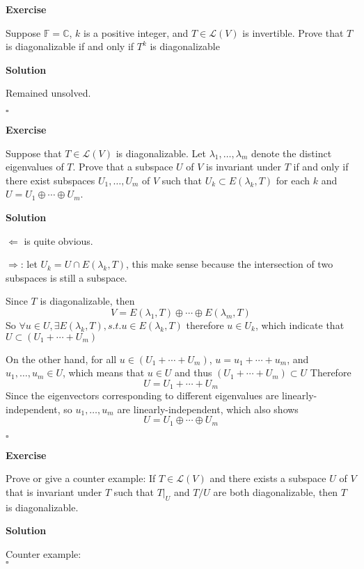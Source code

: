 \documentclass{article}
\newenvironment{exercise}{%
{\textbf{Exercise\\}
    }
}{
}
\newenvironment{solution}{%
{
    \textbf{Solution\\}
    }
}{
  \hfill $\square$ 
  \par\bigskip 
}
\newcommand{\CC}{\mathbb{C}}
\newcommand{\FF}{\mathbb{F}}
\begin{document}
\begin{CJK}{UTF8}{gkai}
\begin{exercise}
    Suppose $\FF = \CC$, $k$ is a positive integer, and $T \in \mathcal{L}(V)$ is invertible. Prove that $T$ is diagonalizable if and only if $T^k$ is diagonalizable
\end{exercise}

\begin{solution}
    Remained unsolved.
\end{solution}

\begin{exercise}
    Suppose that $T \in \mathcal{L}(V)$ is diagonalizable. Let $\lambda_1,\ldots, \lambda_m$ denote the distinct eigenvalues of $T$. Prove that a subspace $U$ of $V$ is invariant under $T$ if and only if there exist subspaces $U_1,\ldots,U_m$ of $V$ such that $U_k \subset E(\lambda_k,T)$ for each $k$ and $U  = U_1 \oplus \cdots\oplus U_m$.
\end{exercise}

\begin{solution}
    $\Leftarrow$ is quite obvious.

    $\Rightarrow$: let $U_k = U \cap E(\lambda_k,T)$, this make sense because the intersection of two subspaces is still a subspace.

    Since $T$ is diagonalizable, then 
    \[V = E (\lambda_1,T)\oplus\cdots\oplus E (\lambda_m,T)\]
    So $\forall u \in U, \exists E(\lambda_k,T), s.t. u \in E(\lambda_k,T)$ therefore $u \in U_k$, which indicate that $U \subset (U_1 + \cdots + U_m)$

    On the other hand, for all $u \in (U_1 + \cdots + U_m)$, $u = u_1 + \cdots + u_m$, and $u_1,\ldots,u_m \in U$, which means that $u \in U$ and thus $(U_1 + \cdots + U_m) \subset U$
    Therefore
    \[U = U_1+\cdots + U_m\]
    Since the eigenvectors corresponding to different eigenvalues are linearly-independent, so $u_1,\ldots,u_m$ are linearly-independent, which also shows 
    \[U = U_1\oplus \cdots \oplus  U_m\]
\end{solution}

\begin{exercise}
    Prove or give a counter example: If $T\in\mathcal{L}(V)$ and there exists a subspace $U$ of $V$ that is invariant under $T$ such that $T|_U$ and $T/U$ are both diagonalizable, then $T$ is diagonalizable.
\end{exercise}

\begin{solution}
    Counter example:\\


\end{solution}
\end{CJK}
\end{document}

